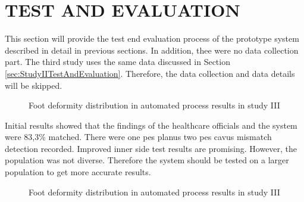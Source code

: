 \section{TEST AND EVALUATION}\label{sec:StudyIIITestAndEvaluation}

This section will provide the test end evaluation process of the prototype system described in detail in previous sections. In addition, thee were no data collection part. The third study uses the same data discussed in Section \ref{sec:StudyIITestAndEvaluation}. Therefore, the data collection and data details will be skipped.

\begin{figure}[htbp]
\centering
{}
\caption{Foot deformity distribution in automated process results in study III}
\label{fig:StudyIIIFootDeformityAutomatedProcessResults}
\end{figure} 

Initial results showed that the findings of the healthcare officials and the system were 83,3\% matched. There were one pes planus two pes cavus mismatch detection recorded. Improved inner side test results are promising. However, the population was not diverse. Therefore the system should be tested on a larger population to get more accurate results.

\begin{figure}[htbp]
\centering
{}
\caption{Foot deformity distribution in automated process results in study III}
\label{fig:StudyIIISlopeResults}
\end{figure} 
